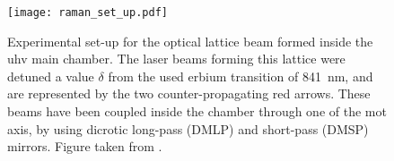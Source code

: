 \begin{figure}[!htbp]\centering
	\texttt{[image: raman\_set\_up.pdf]}
	\caption[Experimental set-up for the optical lattice beam formed inside the \ac{uhv} main chamber]{Experimental set-up for the optical lattice beam formed inside the \ac{uhv} main chamber. The laser beams forming this lattice were detuned a value $\delta$ from the used erbium transition of \SI{841}{\nano\meter}, and are represented by the two counter-propagating red arrows. These beams have been coupled inside the chamber through one of the \ac{mot} axis, by using dicrotic long-pass (DMLP) and short-pass (DMSP) mirrors. Figure taken from \cite{Helten2019}.}\label{fig:raman_set_up}
\end{figure}


